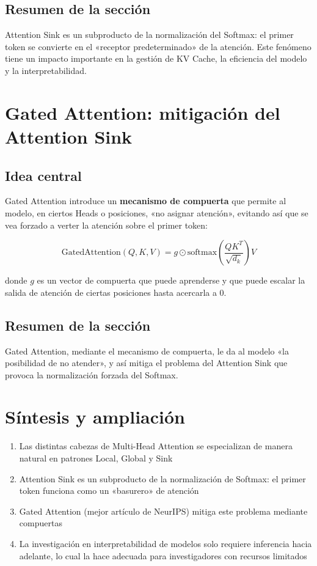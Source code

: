 \documentclass[a4paper]{article}
\begin{document}
\subsection{Resumen de la sección}

Attention Sink es un subproducto de la normalización del Softmax: el primer token se convierte en el «receptor predeterminado» de la atención. Este fenómeno tiene un impacto importante en la gestión de KV Cache, la eficiencia del modelo y la interpretabilidad.

\section{Gated Attention: mitigación del Attention Sink}

\subsection{Idea central}

Gated Attention introduce un \textbf{mecanismo de compuerta} que permite al modelo, en ciertos Heads o posiciones, «no asignar atención», evitando así que se vea forzado a verter la atención sobre el primer token:

$$
\text{GatedAttention}(Q, K, V) = g \odot \text{softmax}\left(\frac{QK^T}{\sqrt{d_k}}\right) V
$$

donde $g$ es un vector de compuerta que puede aprenderse y que puede escalar la salida de atención de ciertas posiciones hasta acercarla a 0.

\subsection{Resumen de la sección}

Gated Attention, mediante el mecanismo de compuerta, le da al modelo «la posibilidad de no atender», y así mitiga el problema del Attention Sink que provoca la normalización forzada del Softmax.

\section{Síntesis y ampliación}

\begin{enumerate}
  \item Las distintas cabezas de Multi-Head Attention se especializan de manera natural en patrones Local, Global y Sink
  \item Attention Sink es un subproducto de la normalización de Softmax: el primer token funciona como un «basurero» de atención
  \item Gated Attention (mejor artículo de NeurIPS) mitiga este problema mediante compuertas
  \item La investigación en interpretabilidad de modelos solo requiere inferencia hacia adelante, lo cual la hace adecuada para investigadores con recursos limitados
\end{enumerate}
\end{document}
